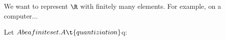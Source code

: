 

We want to represent $\R$ with finitely many elements. For example, on a computer...


Let $A be a finite set.
A \t{quantiziation} $q: \R \to

\blankpage
